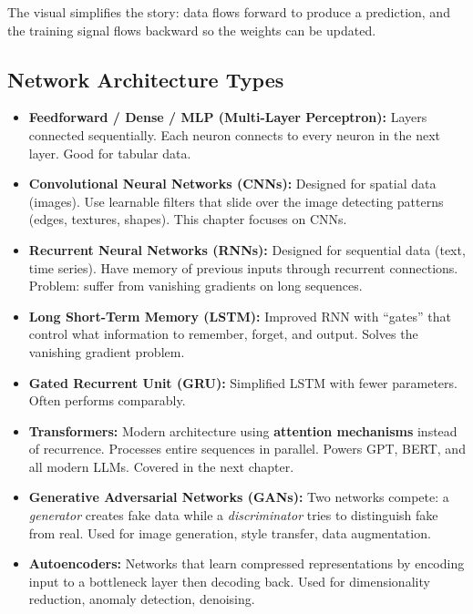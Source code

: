 \documentclass[12pt, a4paper, oneside]{book}
\begin{document}
The visual simplifies the story: data flows forward to produce a prediction, and the training signal flows backward so the weights can be updated.

\subsection{Network Architecture Types}

\begin{itemize}[leftmargin=2em]
    \item \textbf{Feedforward / Dense / MLP (Multi-Layer Perceptron):} Layers connected sequentially. Each neuron connects to every neuron in the next layer. Good for tabular data.
    \item \textbf{Convolutional Neural Networks (CNNs):} Designed for spatial data (images). Use learnable filters that slide over the image detecting patterns (edges, textures, shapes). This chapter focuses on CNNs.
    \item \textbf{Recurrent Neural Networks (RNNs):} Designed for sequential data (text, time series). Have memory of previous inputs through recurrent connections. Problem: suffer from vanishing gradients on long sequences.
    \item \textbf{Long Short-Term Memory (LSTM):} Improved RNN with ``gates'' that control what information to remember, forget, and output. Solves the vanishing gradient problem.
    \item \textbf{Gated Recurrent Unit (GRU):} Simplified LSTM with fewer parameters. Often performs comparably.
    \item \textbf{Transformers:} Modern architecture using \textbf{attention mechanisms} instead of recurrence. Processes entire sequences in parallel. Powers GPT, BERT, and all modern LLMs. Covered in the next chapter.
    \item \textbf{Generative Adversarial Networks (GANs):} Two networks compete: a \emph{generator} creates fake data while a \emph{discriminator} tries to distinguish fake from real. Used for image generation, style transfer, data augmentation.
    \item \textbf{Autoencoders:} Networks that learn compressed representations by encoding input to a bottleneck layer then decoding back. Used for dimensionality reduction, anomaly detection, denoising.
\end{itemize}
\end{document}
